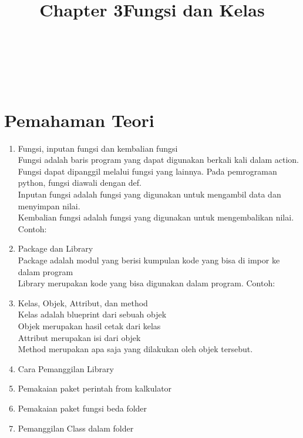 \begin{center}
\title{\LARGE\bf Chapter 3}\\
\title{\LARGE \bf Fungsi dan Kelas}\\
\end{center}

\appendix
\section{Pemahaman Teori}

\begin{enumerate}
\item Fungsi, inputan fungsi dan kembalian fungsi\\
Fungsi adalah baris program yang dapat digunakan berkali kali dalam action. Fungsi dapat dipanggil melalui fungsi yang lainnya. Pada pemrograman python, fungsi diawali dengan def.\\
Inputan fungsi adalah fungsi yang digunakan untuk mengambil data dan menyimpan nilai.\\
Kembalian fungsi adalah fungsi yang digunakan untuk mengembalikan nilai. Contoh:



\item Package dan Library\\
Package adalah modul yang berisi kumpulan kode yang bisa di impor ke dalam program\\
Library merupakan kode yang bisa digunakan dalam program. Contoh:



\item Kelas, Objek, Attribut, dan method\\
Kelas adalah blueprint dari sebuah objek\\
Objek merupakan hasil cetak dari kelas\\
Attribut merupakan isi dari objek\\
Method merupakan apa saja yang dilakukan oleh objek tersebut.\\

\item Cara Pemanggilan Library


\item Pemakaian paket perintah from kalkulator\\


\item Pemakaian paket fungsi beda folder\\


\item Pemanggilan Class dalam folder\\

\end{enumerate}

